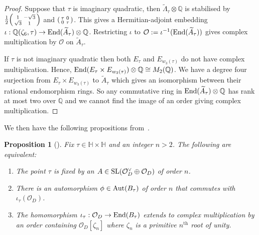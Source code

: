 \documentclass[a4paper,11pt]{amsart}
\numberwithin{equation}{section}
\numberwithin{figure}{section}
\numberwithin{table}{section}
\newtheorem{proposition}[theorem]{Proposition}
\newcommand{\Q}{\mathbb{Q}}
\DeclareMathOperator{\SL}{{\rm{SL}}}
\DeclareMathOperator{\End}{{\rm{End}}}
\DeclareMathOperator{\Aut}{{\rm{Aut}}}
\begin{document}
\begin{proof}
    Suppose that $\tau$ is imaginary quadratic, then $\widetilde{\Lambda}_{\tau}\otimes\Q$ is stabilised by $\frac{1}{2}\begin{psmallmatrix}
        1 & -\sqrt{3} \\
        \sqrt{3} & 1
    \end{psmallmatrix}$ and $\begin{psmallmatrix}
        \tau & 0 \\
        0 & \tau
    \end{psmallmatrix}$. This gives a Hermitian-adjoint embedding $\iota:\Q(\zeta_{6},\tau)\to\End(\widetilde{A}_{\tau})\otimes\Q$.
    Restricting $\iota$ to $\mathcal{O}:=\iota^{-1}(\End(\widetilde{A}_{\tau}))$ gives complex multiplication by $\mathcal{O}$ on $\widetilde{A}_{\tau}$.

    If $\tau$ is not imaginary quadratic then both $E_{\tau}$ and $E_{w_{3}(\tau)}$ do not have complex multiplication. Hence, $\End(E_{\tau}\times E_{w_{3}(\tau)})\otimes\Q\cong M_{2}(\Q)$. We have a degree four surjection from $E_{\tau}\times E_{w_{3}(\tau)}$ to $\widetilde{A}_{\tau}$ which gives an isomorphism between their rational endomorphism rings. So any commutative ring in $\End(\widetilde{A}_{\tau})\otimes\Q$ has rank at most two over $\Q$ and we cannot find the image of an order giving complex multiplication.
\end{proof}

We then have the following propositions from~\cite{Muk}.

\begin{proposition}[{\cite[Proposition 3.3]{Muk}}]\label{prop:Muk-3.3}
    Fix $\tau\in\mathbb{H}\times\mathbb{H}$ and an integer $n>2$. The following are equivalent:
    \begin{enumerate}
        \item The point $\tau$ is fixed by an $A\in\SL(\mathcal{O}_{D}^{\vee}\oplus\mathcal{O}_{D})$ of order $n$.
        \item There is an automorphism $\phi\in\Aut(B_{\tau})$ of order $n$ that commutes with $\iota_{\tau}(\mathcal{O}_{D})$.
        \item The homomorphism $\iota_{\tau}:\mathcal{O}_{D}\to\End(B_{\tau})$ extends to complex multiplication by an order containing $\mathcal{O}_{D}[\zeta_{n}]$ where $\zeta_{n}$ is a primitive $n^{\text{th}}$ root of unity.
    \end{enumerate}
\end{proposition}
\end{document}
